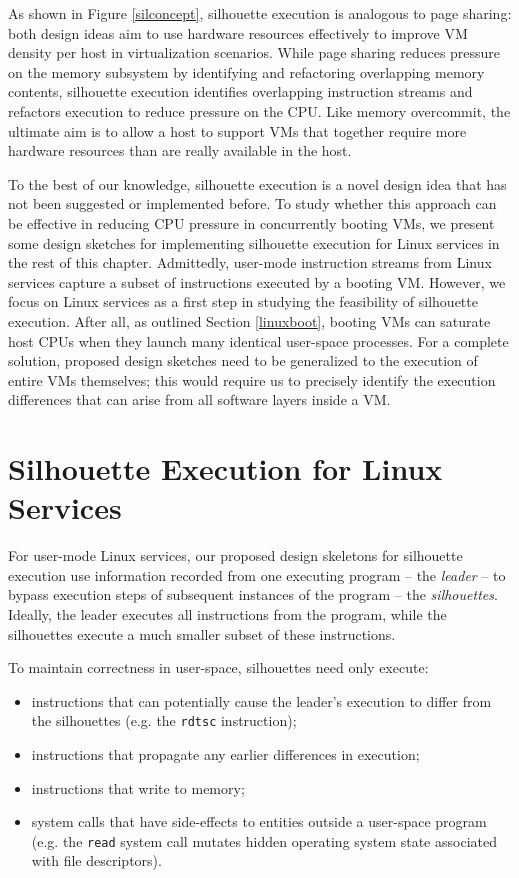 As shown in Figure \ref{silconcept},
silhouette execution is analogous
to page sharing:
both design ideas aim to use hardware
resources effectively to improve VM density per host
in virtualization scenarios.
While page sharing reduces
pressure on the memory subsystem
by identifying and refactoring
overlapping memory contents,
silhouette execution identifies
overlapping instruction streams
and refactors execution to
reduce pressure on the CPU.
Like memory overcommit,
the ultimate aim is to allow a host 
to support VMs that together require
more hardware resources than are really available
in the host.

To the best of our knowledge, silhouette execution is a novel
design idea that has not been
suggested or implemented before.
To study whether this approach
can be effective in reducing CPU pressure
in concurrently booting VMs,
we present some design sketches for implementing silhouette
execution for Linux services in the rest of this chapter. Admittedly,
user-mode instruction streams 
from Linux services capture
a subset of instructions
executed by a booting VM.
However, we focus on 
Linux services as a first step in
studying the feasibility of 
silhouette execution.
After all, as outlined
Section \ref{linuxboot}, booting VMs
can saturate host CPUs when they launch many
identical user-space processes.
For a complete solution, proposed design sketches need to be 
generalized to the execution of entire
VMs themselves; this would require us to precisely
identify the execution differences that can
arise from all software layers inside a VM. \newline

\section{Silhouette Execution for Linux Services} \label{subsil}
For user-mode Linux services, our
proposed design skeletons for silhouette execution
use  information recorded from one
executing program -- the {\em leader} -- to
bypass execution steps of subsequent instances
of the program  -- the {\em silhouettes}. 
Ideally, the leader executes all instructions from the program, 
while the silhouettes execute a much smaller subset
of these instructions.  

\newpage
To maintain correctness in user-space,
silhouettes need only execute: 

\begin{itemize}
\item instructions that can potentially cause the leader's
  execution to differ from the silhouettes (e.g. the \texttt{rdtsc}
  instruction); 
\item instructions that propagate any earlier differences in execution; 
\item instructions that write to memory;
\item system calls that have side-effects to entities
  outside a user-space program
  (e.g. the \texttt{read} system call mutates hidden operating system 
  state associated with file descriptors).
\end{itemize}

